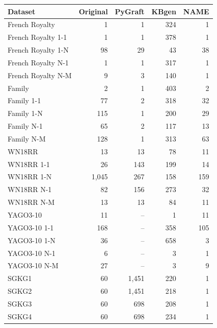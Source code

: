\begin{tabular}{lrrrr}
\toprule
Dataset & Original & PyGraft & KBgen & NAME \\
\midrule
French Royalty & 1 & 1 & 324 & 1 \\
French Royalty 1-1 & 1 & 1 & 378 & 1 \\
French Royalty 1-N & 98 & 29 & 43 & 38 \\
French Royalty N-1 & 1 & 1 & 317 & 1 \\
French Royalty N-M & 9 & 3 & 140 & 1 \\
\midrule
Family & 2 & 1 & 403 & 2 \\
Family 1-1 & 77 & 2 & 318 & 32 \\
Family 1-N & 115 & 1 & 200 & 29 \\
Family N-1 & 65 & 2 & 117 & 13 \\
Family N-M & 128 & 1 & 313 & 63 \\
\midrule
WN18RR & 13 & 13 & 78 & 11 \\
WN18RR 1-1 & 26 & 143 & 199 & 14 \\
WN18RR 1-N & 1{,}045 & 267 & 158 & 159 \\
WN18RR N-1 & 82 & 156 & 273 & 32 \\
WN18RR N-M & 13 & 13 & 84 & 11 \\
\midrule
YAGO3-10 & 11 & – & 1 & 11 \\
YAGO3-10 1-1 & 168 & – & 358 & 105 \\
YAGO3-10 1-N & 36 & – & 658 & 3 \\
YAGO3-10 N-1 & 6 & – & 3 & 1 \\
YAGO3-10 N-M & 27 & – & 3 & 9 \\
\midrule
SGKG1 & 60 & 1{,}451 & 220 & 1 \\
SGKG2 & 60 & 1{,}451 & 218 & 1 \\
SGKG3 & 60 & 698 & 208 & 1 \\
SGKG4 & 60 & 698 & 234 & 1 \\
\bottomrule
\end{tabular}
